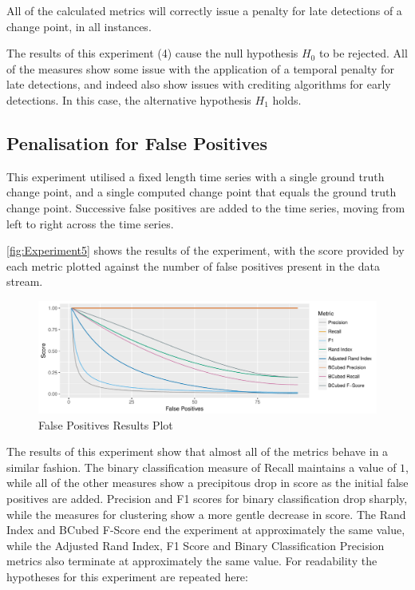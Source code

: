 \documentclass[../main.tex]{subfiles}
\begin{document}
\begin{nullhypothesis*}
    All of the calculated metrics will correctly issue a penalty for late detections of a change point, in all instances.
\end{nullhypothesis*}

The results of this experiment (4) cause the null hypothesis $H_0$ to be rejected. All of the measures show some issue with the application of a temporal penalty for late detections, and indeed also show issues with crediting algorithms for early detections. In this case, the alternative hypothesis $H_1$ holds.

\subsection{Penalisation for False Positives}

This experiment utilised a fixed length time series with a single ground truth change point, and a single computed change point that equals the ground truth change point. Successive false positives are added to the time series, moving from left to right across the time series.

\autoref{fig:Experiment5} shows the results of the experiment, with the score provided by each metric plotted against the number of false positives present in the data stream.

\begin{figure}[h]
    \includegraphics[width=\textwidth]{figures/Experiment5}
    \caption{False Positives Results Plot}
    \label{fig:Experiment5}
\end{figure}

The results of this experiment show that almost all of the metrics behave in a similar fashion. The binary classification measure of Recall maintains a value of $1$, while all of the other measures show a precipitous drop in score as the initial false positives are added. Precision and F1 scores for binary classification drop sharply, while the measures for clustering show a more gentle decrease in score. The Rand Index and BCubed F-Score end the experiment at approximately the same value, while the Adjusted Rand Index, F1 Score and Binary Classification Precision metrics also terminate at approximately the same value. For readability the hypotheses for this experiment are repeated here:
\end{document}
